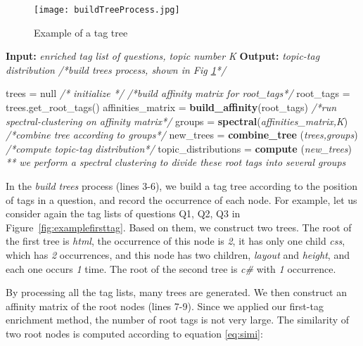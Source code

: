 \begin{figure}[htp]
\centering
\texttt{[image: buildTreeProcess.jpg]}  
\caption{Example of a tag tree}
\label{fig:tagtree} 
\end{figure}



\begin{algorithm}%
\begin{algorithmic}[1]
\label{algo:algotopic}
\State \textbf{Input:} \textit{ enriched tag list of questions, topic number K}
\State \textbf{Output:} \textit{topic-tag distribution}
\State \textit{/*build trees process, shown in Fig \ref{fig:tagtree}*/}

\State trees = null \textit{/* initialize */}
\EndFor
\State \textit{/*build affinity matrix for root\_tags*/}
\State root\_tags = trees.get\_root\_tags() 
\State   affinities\_matrix = \textbf{build\_affinity}(root\_tags) 
\State  \textit{/*run spectral-clustering on affinity matrix*/}
\State  groups = \textbf{spectral}(\textit{affinities\_matrix,K})
\State  \textit{/*combine tree according to groups*/}
\State  new\_trees = \textbf{combine\_tree} (\textit{trees,groups})   
\State  \textit{/*compute topic-tag distribution*/}
\State  topic\_distributions = \textbf{compute} (\textit{new\_trees})
\State \textit{** we perform a spectral clustering to divide these root tags into several groups}
\end{algorithmic}
\end{algorithm}

In the \textit{build trees} process (lines 3-6), we build a tag tree according to the position of tags in a question, and record the occurrence of each node. For example, let us consider again the tag lists of questions Q1, Q2, Q3 in Figure~\ref{fig:examplefirsttag}. Based on them, we construct two trees. The root of the first tree is \textit{html}, the occurrence of this node is \textit{2}, it has only one child \textit{css}, which has \textit{2} occurrences, and this node has two children, \textit{layout} and \textit{height}, and each one occurs \textit{1} time. The root of the second tree is \textit{c\#} with \textit{1} occurrence.

By processing all the tag lists, many trees are generated. We then construct an affinity matrix of the root nodes (lines 7-9). Since we applied our first-tag enrichment method, the number of root tags is not very large. The similarity of two root nodes is computed according to equation \ref{eq:simi}:


